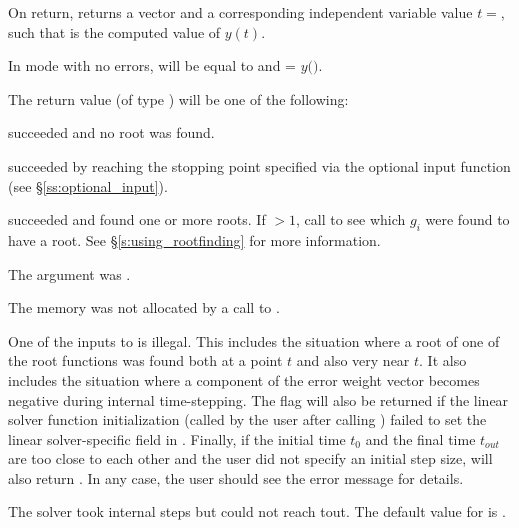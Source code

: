 {
  On return,  returns a vector  and a corresponding 
  independent variable value $t=$, such that  is the computed 
  value of $y(t)$.

  In  mode with no errors,  will be equal to  
  and  = $y($$)$.

  The return value  (of type ) will be one of the following:
  \begin{args}
  \item[\Id{CV\_SUCCESS}]
     succeeded and no root was found.
  \item[\Id{CV\_TSTOP\_RETURN}]
     succeeded by reaching the stopping point specified via the
    optional input function  (see \S\ref{ss:optional_input}).
  \item[\Id{CV\_ROOT\_RETURN}]
     succeeded and found one or more roots.  If 
     $>1$, call  to see which $g_i$ were found to
     have a root.  See \S\ref{s:using_rootfinding} for more information.
  \item[\Id{CV\_MEM\_NULL}]
    The  argument was .
  \item[\Id{CV\_NO\_MALLOC}]
    The {\cvode} memory was not allocated by a call to .
  \item[\Id{CV\_ILL\_INPUT}]
    One of the inputs to  is illegal. This includes the situation where
    a root of one of the root functions was found both at a point $t$ and also
    very near $t$.  It also includes the situation 
    where a component of the error weight vector becomes negative during internal 
    time-stepping. The  flag will also be returned if the linear 
    solver function initialization (called by the user after calling 
    ) failed to set the linear solver-specific  field
    in . Finally, if the initial time $t_0$ and the final time
    $t_{out}$ are too close to each other and the user did not specify an initial
    step size,  will also return .
    In any case, the user should see the error message for details.
  \item[\Id{CV\_TOO\_MUCH\_WORK}] 
    The solver took  internal steps but could not reach tout. 
    The default value for  is .
  \item[\Id{CV\_TOO\_MUCH\_ACC}] 

\end{args}}
